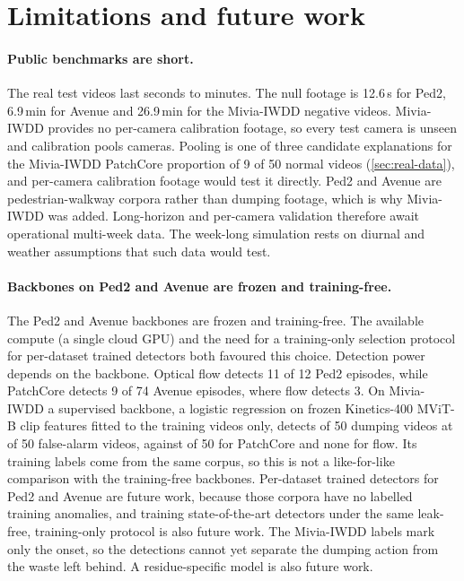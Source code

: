 \section{Limitations and future work}
\label{sec:limitations}

\paragraph{Public benchmarks are short.}
The real test videos last seconds to minutes. The null footage is 12.6\,s for Ped2, 6.9\,min for Avenue and 26.9\,min for the Mivia-IWDD negative videos. Mivia-IWDD provides no per-camera calibration footage, so every test camera is unseen and calibration pools cameras. Pooling is one of three candidate explanations for the Mivia-IWDD PatchCore proportion of 9 of 50 normal videos (\cref{sec:real-data}), and per-camera calibration footage would test it directly. Ped2 and Avenue are pedestrian-walkway corpora rather than dumping footage, which is why Mivia-IWDD was added. Long-horizon and per-camera validation therefore await operational multi-week data. The week-long simulation rests on diurnal and weather assumptions that such data would test.

\paragraph{Backbones on Ped2 and Avenue are frozen and training-free.} The Ped2 and Avenue backbones are frozen and training-free. The available compute (a single cloud GPU) and the need for a training-only selection protocol for per-dataset trained detectors both favoured this choice. Detection power depends on the backbone. Optical flow detects 11 of 12 Ped2 episodes, while PatchCore detects 9 of 74 Avenue episodes, where flow detects 3. On Mivia-IWDD a supervised backbone, a logistic regression on frozen Kinetics-400 MViT-B clip features fitted to the training videos only, detects \RThreeMiviaSupDetk{} of 50 dumping videos at \RThreeMiviaSupFAk{} of 50 false-alarm videos, against \RThreeMiviaPCDetk{} of 50 for PatchCore and none for flow. Its training labels come from the same corpus, so this is not a like-for-like comparison with the training-free backbones. Per-dataset trained detectors for Ped2 and Avenue are future work, because those corpora have no labelled training anomalies, and training state-of-the-art detectors under the same leak-free, training-only protocol is also future work. The Mivia-IWDD labels mark only the onset, so the detections cannot yet separate the dumping action from the waste left behind. A residue-specific model is also future work.


